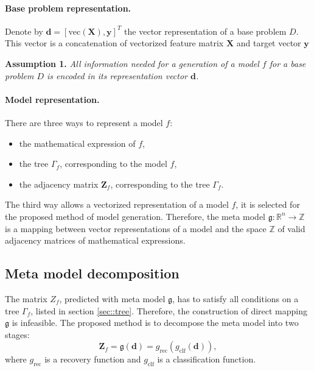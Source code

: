 \documentclass[12pt]{article}
\let\originalparagraph\paragraph
\renewcommand{\paragraph}[2][.]{\originalparagraph{#2#1}}
\begin{document}
\paragraph{Base problem representation}
Denote by $\mathbf{d} = [\text{vec}(\mathbf{X}), \mathbf{y}]^T$ the vector representation of a base problem $D$. This vector is a concatenation of vectorized feature matrix $\mathbf{X}$ and target vector $\mathbf{y}$

\textbf{Assumption 1.} \textit{All information needed for a generation of a model $f$ for a base problem $D$ is encoded in its representation vector $\mathbf{d}$.}

\paragraph{Model representation}
There are three ways to represent a model $f$:
\begin{itemize}
  \item the mathematical expression of $f$,
  \item the tree $\Gamma_f$, corresponding to the model $f$,
  \item the adjacency matrix $\mathbf{Z}_f$, corresponding to the tree $\Gamma_f$.
\end{itemize}

The third way allows a vectorized representation of a model $f$, it is selected for the proposed method of model generation.
Therefore, the meta model $\mathfrak{g}: \mathbb{R}^n \rightarrow \mathbb{Z}$ is a mapping between vector representations of a model and the space $\mathbb{Z}$ of valid adjacency matrices of mathematical expressions.

\subsection{Meta model decomposition}
The matrix $Z_f$, predicted with meta model $\mathfrak{g}$, has to satisfy all conditions on a tree $\Gamma_f$, listed in section \ref{sec::tree}.
Therefore, the construction of direct mapping $\mathfrak{g}$ is infeasible.
The proposed method is to decompose the meta model into two stages:
\begin{equation}
  \mathbf{Z}_f = \mathfrak{g}(\mathbf{d}) = g_\text{rec}(g_\text{clf}(\mathbf{d})),
\end{equation}
where $g_\text{rec}$ is a recovery function and $g_\text{clf}$ is a classification function.
\end{document}
